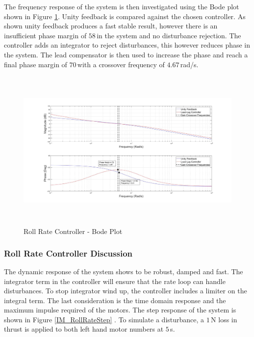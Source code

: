 	The frequency response of the system is then investigated using the Bode plot shown in Figure \ref{IM_RollRateControlBode}. Unity feedback is compared against the chosen controller. As shown unity feedback produces a fast stable result, however there is an insufficient phase margin of $58$\textdegree\,in the system and no disturbance rejection. The controller adds an integrator to reject disturbances, this however reduces phase in the system. The lead compensator is then used to increase the phase and reach a final phase margin of $70$\textdegree\,with a crossover frequency of $4.67$\,rad/s.
	
	\begin{figure}[H]
		\centering
		\includegraphics[height = 8cm]{../Design/Matlab/Controllers/roll_rate_bode.jpg}
		\caption{Roll Rate Controller -  Bode Plot}
		\label{IM_RollRateControlBode}
	\end{figure}
	
		\subsubsection{Roll Rate Controller Discussion}
		The dynamic response of the system shows to be robust, damped and fast. The integrator term in the controller will ensure that the rate loop can handle disturbances. To stop integrator wind up, the controller includes a limiter on the integral term. The last consideration is the time domain response and the maximum impulse required of the motors. The step response of the system is shown in Figure \ref{IM_RollRateStep} . To simulate a disturbance, a $1$\,N loss in thrust is applied to both left hand motor numbers at $5$\,s.
		
